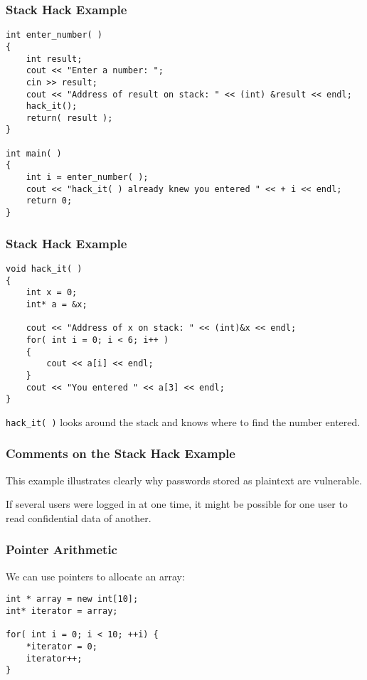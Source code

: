 \begin{frame}[fragile]
\frametitle{Stack Hack Example}
{\scriptsize
\begin{verbatim}
int enter_number( )
{
    int result;
    cout << "Enter a number: ";
    cin >> result;
    cout << "Address of result on stack: " << (int) &result << endl;
    hack_it();
    return( result );
}

int main( )
{
    int i = enter_number( );
    cout << "hack_it( ) already knew you entered " << + i << endl;
    return 0;
}
\end{verbatim}
}

\end{frame}

\begin{frame}[fragile]
\frametitle{Stack Hack Example}
{\scriptsize
\begin{verbatim}
void hack_it( )
{
    int x = 0;
    int* a = &x;

    cout << "Address of x on stack: " << (int)&x << endl;
    for( int i = 0; i < 6; i++ )
    {
        cout << a[i] << endl;	
    }
    cout << "You entered " << a[3] << endl;
}    
\end{verbatim}
}

\texttt{hack\_it( )} looks around the stack and knows where to find the number entered.

\end{frame}

\begin{frame}
\frametitle{Comments on the Stack Hack Example}

This example illustrates clearly why passwords stored as plaintext are vulnerable.

If several users were logged in at one time, it might be possible for one user to read confidential data of another.

\end{frame}




\begin{frame}[fragile]
\frametitle{Pointer Arithmetic}

We can use pointers to allocate an array:

\begin{verbatim}
int * array = new int[10];
int* iterator = array;

for( int i = 0; i < 10; ++i) {
    *iterator = 0;
    iterator++;
}


\end{verbatim}


\end{frame}

